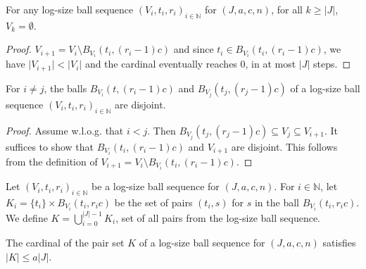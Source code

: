 \begin{lemma}\label{lem:logSizeBallSequence_eq_zero}
  \mathlibok
For any log-size ball sequence $(V_i, t_i, r_i)_{i \in \mathbb{N}}$ for $(J, a, c, n)$, for all $k \ge \vert J \vert$, $V_k = \emptyset$.
\end{lemma}

\begin{proof}
$V_{i+1} = V_i \setminus B_{V_i}(t_i, (r_i - 1)c)$ and since $t_i \in B_{V_i}(t_i, (r_i - 1)c)$, we have $\vert V_{i+1} \vert < \vert V_i \vert$ and the cardinal eventually reaches $0$, in at most $\vert J \vert$ steps.
\end{proof}


\begin{lemma}\label{lem:logSizeBallSequence_disjoint_B}
  \mathlibok
For $i \ne j$, the balls $B_{V_i}(t, (r_i-1)c)$ and $B_{V_j}(t_j, (r_j-1)c)$ of a log-size ball sequence $(V_i, t_i, r_i)_{i \in \mathbb{N}}$ are disjoint.
\end{lemma}

\begin{proof}
Assume w.l.o.g. that $i < j$.
Then $B_{V_j}(t_j, (r_j-1)c) \subseteq V_j \subseteq V_{i+1}$.
It suffices to show that $B_{V_i}(t_i, (r_i-1)c)$ and $V_{i+1}$ are disjoint.
This follows from the definition of $V_{i+1} = V_i \setminus B_{V_i}(t_i, (r_i-1)c)$.
\end{proof}


\begin{definition}\label{def:pairSet}
  \mathlibok
Let $(V_i, t_i, r_i)_{i \in \mathbb{N}}$ be a log-size ball sequence for $(J, a, c, n)$.
For $i \in \mathbb{N}$, let $K_i = \{t_i\} \times B_{V_i}(t_i, r_i c)$ be the set of pairs $(t_i, s)$ for $s$ in the ball $B_{V_i}(t_i, r_i c)$.
We define $K = \bigcup_{i=0}^{\vert J \vert-1} K_i$, set of all pairs from the log-size ball sequence.
\end{definition}


\begin{lemma}\label{lem:card_pairSet_le}
  \mathlibok
The cardinal of the pair set $K$ of a log-size ball sequence for $(J, a, c, n)$ satisfies $|K| \le a |J|$.
\end{lemma}

